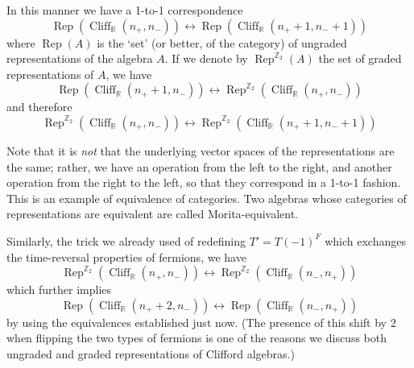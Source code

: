 \documentclass[12pt]{article}
\numberwithin{equation}{section}
\numberwithin{figure}{section}
\theoremstyle{remark}
\def\bR{\mathbb{R}}
\def\bZ{\mathbb{Z}}
\def\Cliff{\mathop{\mathrm{Cliff}}\nolimits}
\def\Rep{\mathop{\mathrm{Rep}}\nolimits}
\begin{document}
In this manner we have a 1-to-1 correspondence \begin{equation}
\Rep(\Cliff_\bR(n_+,n_-)) \leftrightarrow \Rep(\Cliff_\bR(n_++1,n_-+1)) 
\label{-}
\end{equation}
where $\Rep(A)$ is the `set' (or better, of the category) of ungraded representations of the algebra $A$.
If we denote by $\Rep^{\bZ_{2}}(A)$ the set of graded representations of $A$, we  have
\begin{equation}
\Rep(\Cliff_\bR(n_++1,n_-)) \leftrightarrow \Rep^{\bZ_2}(\Cliff_\bR(n_+,n_-)) 
\end{equation}
and therefore 
 \begin{equation}
\Rep^{\bZ_2}(\Cliff_\bR(n_+,n_-)) \leftrightarrow \Rep^{\bZ_2}(\Cliff_\bR(n_++1,n_-+1)) 
\end{equation}

Note that it is \emph{not} that the underlying vector spaces of the representations are the same;
rather, we have an operation from the left to the right, and  another operation from the right to the left,
so that they correspond in a 1-to-1 fashion.
This is an example of equivalence of categories.
Two algebras whose categories of representations are equivalent are called Morita-equivalent.

Similarly, the trick we already used of redefining $T'=T(-1)^F$ which exchanges 
the time-reversal properties of fermions, we have \begin{equation}
\Rep^{\bZ_2}(\Cliff_\bR(n_+,n_-)) \leftrightarrow \Rep^{\bZ_2}(\Cliff_\bR(n_-,n_+)) 
\end{equation} which further implies \begin{equation}
\Rep(\Cliff_\bR(n_++2,n_-)) \leftrightarrow \Rep(\Cliff_\bR(n_-,n_+))
\label{funny-cliff-equiv}
\end{equation} by using the equivalences established just now.
(The presence of this shift by 2 when flipping the two types of fermions is one of the reasons
we discuss both ungraded and graded representations of Clifford algebras.)
\end{document}
